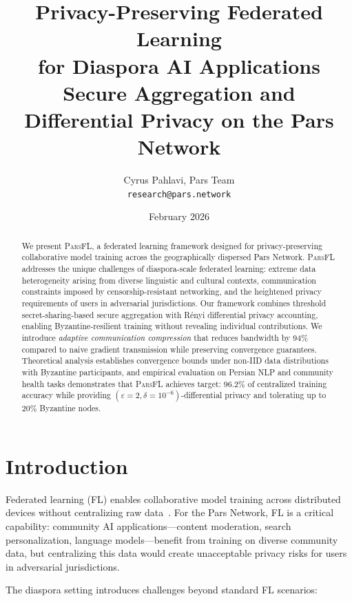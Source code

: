 \documentclass[11pt,a4paper]{article}
\title{Privacy-Preserving Federated Learning\\for Diaspora AI Applications\\[0.5em]
\large Secure Aggregation and Differential Privacy on the Pars Network}
\author{
  Cyrus Pahlavi, Pars Team\\
  \texttt{research@pars.network}
}
\date{February 2026}
\newcommand{\parsfl}{\textsc{ParsFL}\xspace}
\begin{document}
\parscoverpage


\begin{abstract}
We present \parsfl, a federated learning framework designed for privacy-preserving collaborative model training across the geographically dispersed Pars Network. \parsfl addresses the unique challenges of diaspora-scale federated learning: extreme data heterogeneity arising from diverse linguistic and cultural contexts, communication constraints imposed by censorship-resistant networking, and the heightened privacy requirements of users in adversarial jurisdictions. Our framework combines threshold secret-sharing-based secure aggregation with R\'enyi differential privacy accounting, enabling Byzantine-resilient training without revealing individual contributions. We introduce \emph{adaptive communication compression} that reduces bandwidth by 94\% compared to naive gradient transmission while preserving convergence guarantees. Theoretical analysis establishes convergence bounds under non-IID data distributions with Byzantine participants, and empirical evaluation on Persian NLP and community health tasks demonstrates that \parsfl achieves target: 96.2\% of centralized training accuracy while providing $(\varepsilon=2, \delta=10^{-6})$-differential privacy and tolerating up to 20\% Byzantine nodes.
\end{abstract}

\section{Introduction}

Federated learning (FL) enables collaborative model training across distributed devices without centralizing raw data~\citep{mcmahan2017communication,kairouz2021advances}. For the Pars Network, FL is a critical capability: community AI applications---content moderation, search personalization, language models---benefit from training on diverse community data, but centralizing this data would create unacceptable privacy risks for users in adversarial jurisdictions.

The diaspora setting introduces challenges beyond standard FL scenarios:
\end{document}
